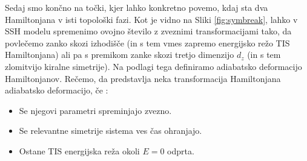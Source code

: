 Sedaj smo končno na točki, kjer lahko konkretno povemo, kdaj sta dva Hamiltonjana v isti topološki fazi.
Kot je vidno na Sliki \ref{fig:symbreak}, lahko v SSH modelu spremenimo ovojno število z zveznimi transformacijami tako, da povlečemo zanko skozi izhodišče (in s tem vmes zapremo energijsko režo TIS Hamiltonjana) ali pa s premikom zanke skozi tretjo dimenzijo $d_z$ (in s tem zlomitvijo kiralne simetrije). Na podlagi tega definiramo adiabatsko deformacijo Hamiltonjanov.
Rečemo, da predstavlja neka transformacija Hamiltonjana adiabatsko deformacijo, če \cite{madzar}:
\begin{itemize}
\item Se njegovi parametri spreminjajo zvezno.
\item Se relevantne simetrije sistema ves čas ohranjajo.
\item Ostane TIS energijska reža okoli $E=0$ odprta.
\end{itemize}
